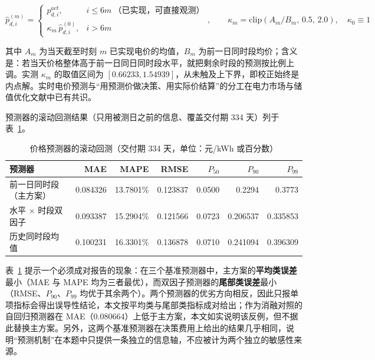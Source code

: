 \begin{equation}
\hat p^{(m)}_{d,i}=
\begin{cases}
p^{act}_{d,i}, & i\le 6m\ \text{（已实现，可直接观测）}\\
\kappa_m\,\hat p^{(0)}_{d,i}, & i>6m
\end{cases},
\qquad
\kappa_m=\mathrm{clip}\!\left(A_m/B_m,\,0.5,\,2.0\right),\quad \kappa_0\equiv1
\end{equation}

其中 $A_m$ 为当天截至时刻 $m$ 已实现电价的均值，$B_m$ 为前一日同时段均价；含义是：若当天价格整体高于前一日同日同时段水平，就把剩余时段的预测按比例上调。实测 $\kappa_m$ 的取值区间为 $[0.66233,1.54939]$，从未触及上下界，即校正始终是内点解。实时电价预测与“用预测价做决策、用实际价结算”的分工在电力市场与储值优化文献中已有共识\cite{ref-lago-2018-spot-price-deep-learning,ref-myttenaere-2016-mape-regression,ref-chitsaz-2018-price-forecast-btm-storage,ref-khani-2015-online-adaptive-rtod,ref-staffell-2016-maximising-storage-value,ref-mathaba-2014-price-forecast-benefit,ref-hodge-2018-forecast-value-storage}。

预测器的滚动回测结果（只用被测日之前的信息、覆盖交付期 334 天）列于表~\ref{tab:p4fc}。

\begin{table}[htbp]
\centering
\small
\caption{价格预测器的滚动回测（交付期 334 天，单位：元/kWh 或百分数）}
\label{tab:p4fc}
\begin{tabular}{lrrrrrr}
\toprule
预测器 & MAE & MAPE & RMSE & $P_{50}$ & $P_{90}$ & $P_{99}$ \\
\midrule
前一日同时段（主方案） & 0.084326 & 13.7801\% & 0.123837 & 0.0500 & 0.2294 & 0.3773 \\
水平 $\times$ 时段双因子 & 0.093387 & 15.2904\% & 0.121566 & 0.0723 & 0.206537 & 0.335853 \\
历史同时段均值 & 0.100231 & 16.3301\% & 0.136878 & 0.0710 & 0.241094 & 0.396309 \\
\bottomrule
\end{tabular}
\end{table}

表~\ref{tab:p4fc} 提示一个必须成对报告的现象：在三个基准预测器中，主方案的\textbf{平均类误差}最小（MAE 与 MAPE 均为三者最优），而双因子预测器的\textbf{尾部类误差}最小（RMSE、$P_{90}$、$P_{99}$ 均优于其余两个）。两个预测器的优劣方向相反，因此只报单项指标会得出误导性结论，本文按平均类与尾部类指标成对给出；作为消融对照的自回归预测器在 MAE（0.080664）上低于主方案，本文如实说明该反例，但不据此替换主方案。另外，这两个基准预测器在决策费用上给出的结果几乎相同，说明“预测机制”在本题中只提供一条独立的信息轴，不应被计为两个独立的敏感性来源。

